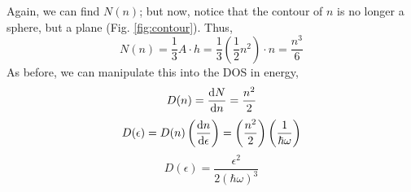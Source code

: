 \documentclass[12pt]{article}
\numberwithin{equation}{section}
\begin{document}
Again, we can find $N(n)$; but now, notice that the contour of $n$ is no longer a sphere, but a plane (Fig. \ref{fig:contour}). Thus,
\begin{equation}
    N(n) = \frac{1}{3}A\cdot h = \frac{1}{3}\left(\frac{1}{2}n^2\right)\cdot n = \frac{n^3}{6}
\end{equation}
As before, we can manipulate this into the DOS in energy,
\begin{equation}
    D(n) = \dv{N}{n} = \frac{n^2}{2}
\end{equation}
\begin{equation}
    D(\epsilon) = D(n) \left(\dv{n}{\epsilon}\right) = \left(\frac{n^2}{2}\right)\left(\frac{1}{\hbar\omega}\right) 
\end{equation}
\begin{equation}
    \boxed{D(\epsilon) = \frac{\epsilon^2}{2(\hbar\omega)^3}}
\end{equation}
\end{document}
